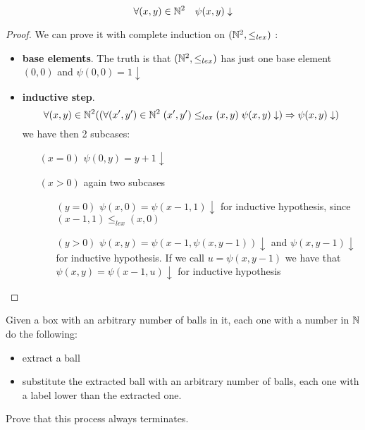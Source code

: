 \newcommand{\nsqlex}{\( (\nat ^2, \leq_{lex})\) }
\begin{theorem}
  \[\forall (x,y) \in \mathbb{N}^2 \quad \psi (x,y) \downarrow \]
  \begin{proof}
    We can prove it with complete induction on \nsqlex:

    \begin{itemize}
    \item \textbf{base elements}. The truth is that \nsqlex has just
      one base element $(0,0)$ and $\psi(0,0)=1\downarrow$
    \item \textbf{inductive step}.
      \[\forall (x,y) \in \mathbb{N}^2 ((\forall (x', y') \in \mathbb{N}^2 \;
        (x',y') \leq_{lex} (x,y) \; \psi(x,y)\downarrow ) \Rightarrow
        \psi(x,y)\downarrow)\] we have then 2 subcases:
      \begin{enumerate}
      \item[$(x=0)$] \(\psi(0,y) = y + 1 \downarrow\)
      \item[$(x>0)$] again two subcases
        \begin{enumerate}
        \item[$(y=0)$] $\psi(x,0) = \psi(x-1,1) \downarrow $ for
          inductive hypothesis, since $(x-1,1) \leq_{lex} (x,0)$
        \item[$(y>0)$] $\psi(x,y) = \psi(x-1,\psi(x,y-1)) \downarrow $
          and $\psi(x,y-1) \downarrow$ for inductive hypothesis. If we
          call $u = \psi(x,y-1)$ we have that
          $\psi(x,y) = \psi(x-1,u) \downarrow $ for inductive
          hypothesis
        \end{enumerate}
      \end{enumerate}
    \end{itemize}
  \end{proof}
\end{theorem}

\begin{exercise}
  Given a box with an arbitrary number of balls in it, each one with a
  number in $\mathbb{N}$ do the following:
  \begin{itemize}
  \item extract a ball
  \item substitute the extracted ball with an arbitrary number of
    balls, each one with a label lower than the extracted one.
  \end{itemize}

  Prove that this process always terminates.
\end{exercise}

